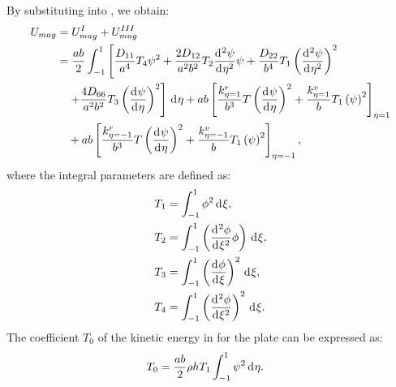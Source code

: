 \documentclass[preprint,12pt]{elsarticle}
\newcommand{\id}{\mathrm{d}\mkern1mu}
\begin{document}
By substituting  into , we obtain:  
%
\begin{equation}\label{eq:poten_energy_toly2}
	\begin{split}
		U_{mag} &= U^{I}_{mag} + U^{III}_{mag} \\
		&= \frac{ab}{2} \int_{-1}^{1} \left[ \frac{D_{11}}{a^4} T_4 \psi^2 
		+ \frac{2D_{12}}{a^2b^2} T_2 \frac{\id^2\psi }{\id \eta^2} \psi 
		+ \frac{D_{22}}{b^4} T_1 \left(\frac{\id^2\psi }{\id \eta^2} \right)^2 \right. \\
		&\quad \left. + \frac{4D_{66}}{a^2b^2} T_3 \left(\frac{\id \psi }{\id \eta} \right)^2 \right] \, \id\eta  + ab \left[ \frac{k^r_{\eta=1}}{b^3} T \left( \frac{\id \psi}{\id \eta} \right)^2
		+ \frac{k^v_{\eta=1}}{b} T_1 \left(\psi\right)^2 \right]_{\eta=1} \\
		&\quad + ab \left[ \frac{k^r_{\eta=-1}}{b^3} T \left( \frac{\id \psi}{\id \eta} \right)^2
		+ \frac{k^v_{\eta=-1}}{b} T_1 \left(\psi\right)^2 \right]_{\eta=-1},
	\end{split}
\end{equation}
%
where the integral parameters are defined as:  
%
\begin{equation}\label{eq:inte_psi}  
	\begin{split}  
		&T_1 = \int_{-1}^{1} \phi^2 \, \id\xi, \\  
		&T_2 = \int_{-1}^{1} \left( \frac{\id^2\phi}{\id\xi^2} \phi \right) \, \id\xi, \\  
		&T_3 = \int_{-1}^{1} \left( \frac{\id\phi}{\id\xi} \right)^2 \, \id\xi, \\  
		&T_4 = \int_{-1}^{1} \left( \frac{\id^2\phi}{\id\xi^2} \right)^2 \, \id\xi.  
	\end{split}  
\end{equation}  
%
The coefficient \( T_0 \) of the kinetic energy in  for the plate can be expressed as:
%
\begin{equation}\label{eq:kine_energyy}
	\begin{split}
		T_0 &= \frac{ab}{2} \rho h T_1 \int_{-1}^{1} \psi^2 \, \id\eta.
	\end{split}
\end{equation}
\end{document}

